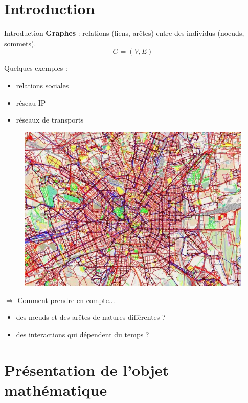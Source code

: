 \documentclass[15pt]{beamer}
\begin{document}
\section*{Introduction}
\begin{frame}{Introduction}
\textbf{Graphes} : relations (liens, arêtes) entre des individus (noeuds, sommets).
\[
	G=(V,E)
\]
\pause
\begin{minipage}{0.4\linewidth}
{\large Quelques exemples :}
\begin{itemize}
    \item relations sociales
    \item réseau IP
    \item réseaux de transports
\end{itemize}
\end{minipage}
\pause
\begin{minipage}{0.5\linewidth}
\begin{figure}
	\centering
    \includegraphics[width=\textwidth]{img/multimodalTransport.jpg}
\end{figure}
\end{minipage}
\pause

$\Rightarrow$ {\large Comment prendre en compte...}
\begin{itemize}
	\item des n\oe{}uds et des arêtes de natures différentes ?
    \item des interactions qui dépendent du temps ?
\end{itemize}
\end{frame}

\section{Présentation de l'objet mathématique}
\end{document}
